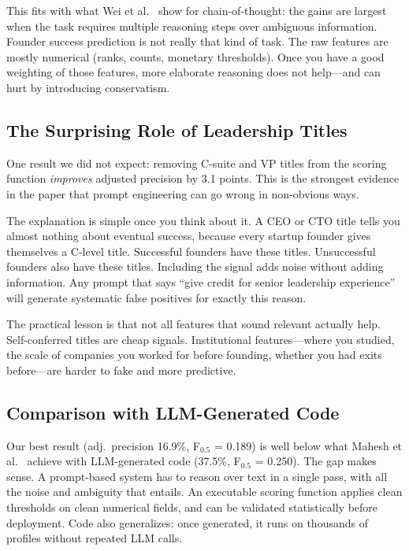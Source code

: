 \documentclass{article}
\begin{document}
This fits with what Wei et al.~\cite{wei2022cot} show for chain-of-thought: the gains are largest when the task requires multiple reasoning steps over ambiguous information. Founder success prediction is not really that kind of task. The raw features are mostly numerical (ranks, counts, monetary thresholds). Once you have a good weighting of those features, more elaborate reasoning does not help---and can hurt by introducing conservatism.

\subsection{The Surprising Role of Leadership Titles}

One result we did not expect: removing C-suite and VP titles from the scoring function \emph{improves} adjusted precision by 3.1 points. This is the strongest evidence in the paper that prompt engineering can go wrong in non-obvious ways.

The explanation is simple once you think about it. A CEO or CTO title tells you almost nothing about eventual success, because every startup founder gives themselves a C-level title. Successful founders have these titles. Unsuccessful founders also have these titles. Including the signal adds noise without adding information. Any prompt that says ``give credit for senior leadership experience'' will generate systematic false positives for exactly this reason.

The practical lesson is that not all features that sound relevant actually help. Self-conferred titles are cheap signals. Institutional features---where you studied, the scale of companies you worked for before founding, whether you had exits before---are harder to fake and more predictive.

\subsection{Comparison with LLM-Generated Code}

Our best result (adj.\ precision 16.9\%, F$_{0.5}$ = 0.189) is well below what Mahesh et al.~\cite{mahesh2026stochastic} achieve with LLM-generated code (37.5\%, F$_{0.5}$ = 0.250). The gap makes sense. A prompt-based system has to reason over text in a single pass, with all the noise and ambiguity that entails. An executable scoring function applies clean thresholds on clean numerical fields, and can be validated statistically before deployment. Code also generalizes: once generated, it runs on thousands of profiles without repeated LLM calls.
\end{document}
